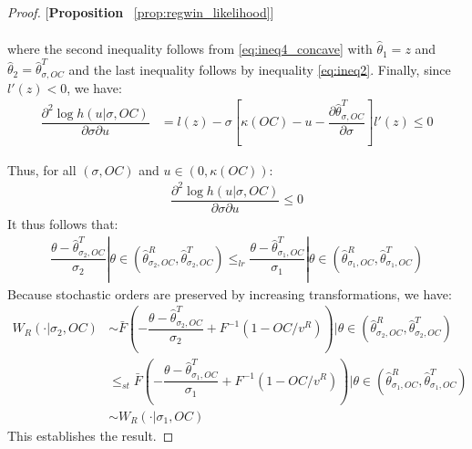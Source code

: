 \begin{proof}{[\textbf{Proposition} ~\ref{prop:regwin_likelihood}]}
\begin{enumerate}[label=(\arabic*),ref=\thelemma(\arabic*)]
\begin{align*}
  \end{align*}
  where the second inequality follows from \eqref{eq:ineq4_concave} with $\hat{\theta}_1=z$ and $\hat{\theta}_2 = \hat{\theta}^T_{\sigma,OC}$ and the last inequality follows by inequality \eqref{eq:ineq2}. Finally, since $l'(z)<0$, we have:
  \begin{align*}
  \dfrac{\partial^2 \log h(u|\sigma,OC)}{\partial \sigma \partial u} &= l(z) - \sigma\left[\kappa(OC)-u-\dfrac{\partial \hat{\theta}^T_{\sigma,OC}}{\partial \sigma}\right]l'(z) \leq 0
  \end{align*}
\end{enumerate}
Thus, for all $(\sigma,OC)$ and $u\in(0,\kappa(OC))$:
\begin{align}\label{eq:ineq5_concave}
    \dfrac{\partial^2 \log h(u|\sigma,OC)}{\partial \sigma \partial u} \leq 0
\end{align}
It thus follows that:
\begin{align*}
  \dfrac{\theta - \hat{\theta}^T_{\sigma_2,OC}}{\sigma_2}|\theta\in (\hat{\theta}^R_{\sigma_2,OC}, \hat{\theta}^T_{\sigma_2,OC}) \leq_{lr} \dfrac{\theta - \hat{\theta}^T_{\sigma_1,OC}}{\sigma_1}|\theta\in (\hat{\theta}^R_{\sigma_1,OC}, \hat{\theta}^T_{\sigma_1,OC})
\end{align*}
Because stochastic orders are preserved by increasing transformations, we have:
\begin{align*}
  W_R(\cdot|\sigma_2,OC) &\sim \bar{F}\left(-\dfrac{\theta - \hat{\theta}^T_{\sigma_2,OC}}{\sigma_2} + F^{-1}(1-OC/v^R)\right)|\theta\in (\hat{\theta}^R_{\sigma_2,OC}, \hat{\theta}^T_{\sigma_2,OC})\\ 
  &\leq_{st} \bar{F}\left(-\dfrac{\theta - \hat{\theta}^T_{\sigma_1,OC}}{\sigma_1}+F^{-1}(1-OC/v^R)\right)|\theta\in (\hat{\theta}^R_{\sigma_1,OC}, \hat{\theta}^T_{\sigma_1,OC}) \\
  &\sim W_R(\cdot|\sigma_1,OC)
\end{align*}
This establishes the result. 
\end{proof}


